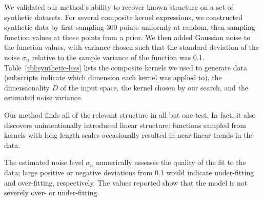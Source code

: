 \documentclass[twoside]{article}
\begin{document}
We validated our method's ability to recover known structure on a set of synthetic datasets.
For several composite kernel expressions, we constructed synthetic data by first sampling 300 points uniformly at random, then sampling function values at those points from a \gp{} prior.
We then added \iid Gaussian noise to the function values, with variance chosen such that the standard deviation of the noise $\sigma_n$ relative to the sample variance of the function was 0.1.
%
%
Table~\ref{tbl:synthetic-less} lists the composite kernels we used to generate data (subscripts indicate which dimension each kernel was applied to), the dimensionality $D$ of the input space, the kernel chosen by our search, and the estimated noise variance.

Our method finds all of the relevant structure in all but one test.  In fact, it also discovers unintentionally introduced linear structure:
functions sampled from \kSE{} kernels with long length scales occasionally resulted in near-linear trends in the data.

The estimated noise level $\sigma_n$ numerically assesses the quality of the fit to the data; large positive or negative deviations from 0.1 would indicate under-fitting and over-fitting, respectively.
The values reported show that the model is not severely over- or under-fitting.







\end{document}
